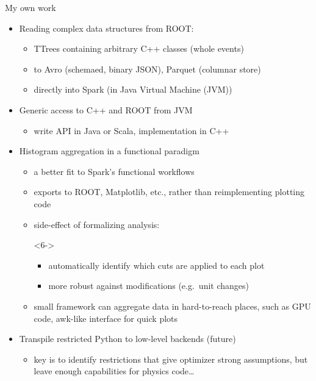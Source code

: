 \documentclass{beamer}
\begin{document}
\begin{frame}{My own work}
\vspace{0.25 cm}
\begin{itemize}
\item<1-> \alert<1>{Reading complex data structures from ROOT:}
\begin{itemize}
\item \alert<1>{TTrees containing arbitrary C++ classes (whole events)}
\item \alert<1>{to Avro (schemaed, binary JSON), Parquet (columnar store)}
\item \alert<1>{directly into Spark (in Java Virtual Machine (JVM))}
\end{itemize}

\item<2-> \alert<2>{Generic access to C++ and ROOT from JVM}
\begin{itemize}
\item \alert<2>{write API in Java or Scala, implementation in C++}
\end{itemize}

\item<3-> \alert<3-7>{Histogram aggregation in a functional paradigm}
\begin{itemize}
\item<4-> \alert<4-7>{a better fit to Spark's functional workflows}
\item<5-> \alert<5-7>{exports to ROOT, Matplotlib, etc., rather than reimplementing plotting code}
\item<6-> \alert<6-7>{side-effect of formalizing analysis:}
\begin{uncoverenv}<6->
\begin{itemize}
\item \alert<6-7>{automatically identify which cuts are applied to each plot}
\item \alert<6-7>{more robust against modifications (e.g.\ unit changes)}
\end{itemize}
\end{uncoverenv}
\item<7-> \alert<7>{small framework can aggregate data in hard-to-reach places, such as GPU code, awk-like interface for quick plots}
\end{itemize}

\item<8-> \alert<8>{Transpile restricted Python to low-level backends (future)}
\begin{itemize}
\item \alert<8>{key is to identify restrictions that give optimizer strong assumptions, but leave enough capabilities for physics code\ldots}
\end{itemize}
\end{itemize}
\end{frame}
\end{document}
